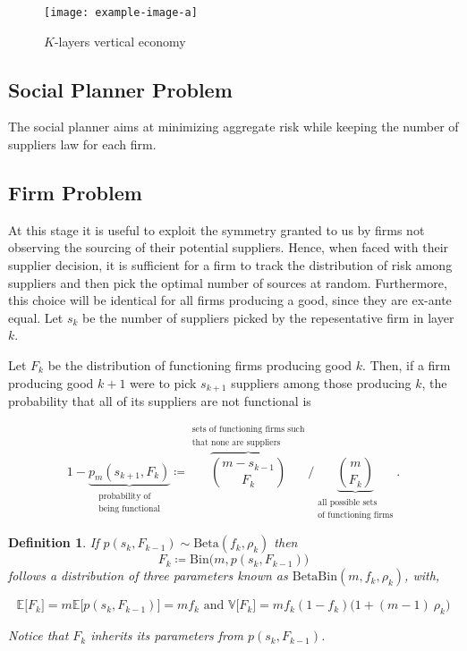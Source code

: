 \documentclass[american, abstract=on]{scrartcl}
\newcommand{\inputTikZ}[2]{%
        \scalebox{#1}{}  
      }
\theoremstyle{plain}
\newtheorem{definition}{Definition}
\newcommand{\E}{\mathbb{E}}
\newcommand{\V}{\mathbb{V}}
\newcommand{\Beta}{\text{Beta}}
\newcommand{\Bin}{\text{Bin}}
\begin{document}
\begin{figure}[H]
  \centering
  \texttt{[image: example-image-a]}
  \caption{$K$-layers vertical economy}
  \label{fig:vertical-economy-diagram}
\end{figure}

\subsection{Social Planner Problem}

The social planner aims at minimizing aggregate risk while keeping the number of suppliers law for each firm.

\subsection{Firm Problem}

At this stage it is useful to exploit the symmetry granted to us by firms not observing the sourcing of their potential suppliers. Hence, when faced with their supplier decision, it is sufficient for a firm to track the distribution of risk among suppliers and then pick the optimal number of sources at random. Furthermore, this choice will be identical for all firms producing a good, since they are ex-ante equal. Let $s_k$ be the number of suppliers picked by the repesentative firm in layer $k$.

Let $F_k$ be the distribution of functioning firms producing good $k$. Then, if a firm producing good $k + 1$ were to pick $s_{k + 1}$ suppliers among those producing $k$, the probability that all of its suppliers are not functional is

\begin{equation}
  1 - \underbrace{p_m(s_{k + 1}, F_k)}_{\substack{\text{probability of} \\ \text{being functional}}} \coloneqq \overbrace{\binom{m - s_{k-1}}{F_k}}^{\substack{\text{sets of functioning firms such} \\ \text{that none are suppliers}}} \Bigg/ \underbrace{\binom{m}{F_k}}_{\substack{\text{all possible sets} \\ \text{of functioning firms}}}.
\end{equation}

\begin{definition} \label{definition:ptoF}
  If $p(s_k, F_{k-1}) \sim \Beta(f_k, \rho_k)$ then \begin{equation}
    F_k \coloneqq \Bin\Big(m, p(s_k, F_{k-1}) \Big)
  \end{equation} follows a distribution of three parameters known as $\Beta\Bin(m, f_k, \rho_k)$, with,

  \begin{equation} \label{eq:moments_of_F}
    \E \big[F_k\big] = m \E \big[p(s_k, F_{k-1})\big] = m f_k \text{ and } \V \big[F_k\big] = m f_k (1 - f_k) \big(1 + (m - 1) \ \rho_k\big)
  \end{equation}

  Notice that $F_k$ inherits its parameters from $p(s_k, F_{k - 1})$.
\end{definition}
\end{document}
